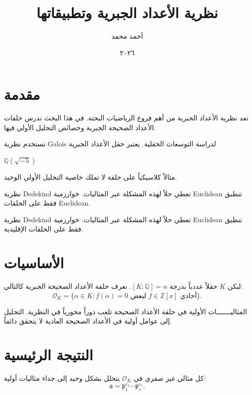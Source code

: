 \documentclass{article}
\title{نظرية الأعداد الجبرية وتطبيقاتها}
\author{أحمد محمد}
\date{٢٠٢٦}
\begin{document}
\maketitle

\section{مقدمة}

تعد نظرية الأعداد الجبرية من أهم فروع الرياضيات البحتة. في هذا البحث ندرس
حلقات الأعداد الصحيحة الجبرية وخصائص التحليل الأولي فيها.


نستخدم نظرية Galois لدراسة التوسعات الحقلية. يعتبر حقل الأعداد الجبرية
\begin{english}$\mathbb{Q}(\sqrt{-5})$\end{english}
مثالاً كلاسيكياً على حلقة لا تملك خاصية التحليل الأولي الوحيد.

نظرية Dedekind تعطي حلاً لهذه المشكلة عبر المثاليات. خوارزمية Euclidean
تنطبق فقط على الحلقات Euclidean.

نظرية \textenglish{Dedekind} تعطي حلاً لهذه المشكلة عبر المثاليات.
خوارزمية \textenglish{Euclidean} تنطبق فقط على الحلقات الإقليدية.

\section{الأساسيات}

ليكن $K$ حقلاً عددياً بدرجة $[K:\mathbb{Q}] = n$.
نعرف حلقة الأعداد الصحيحة الجبرية كالتالي:
\[
  \mathcal{O}_K = \{ \alpha \in K : f(\alpha) = 0 \text{ لبعض } f \in \mathbb{Z}[x] \text{ أحادي} \}.
\]

المثاليـــــــات الأولية في حلقة الأعداد الصحيحة تلعب دوراً محورياً في النظرية.
التحليل إلى عوامل أولية في الأعداد الصحيحة العادية لا يتحقق دائماً.

\section{النتيجة الرئيسية}

\begin{theorem}
كل مثالي غير صفري في $\mathcal{O}_K$ يتحلل بشكل وحيد إلى جداء مثاليات
أولية:
\[
  \mathfrak{a} = \mathfrak{p}_1^{e_1} \cdots \mathfrak{p}_r^{e_r}.
\]
\end{theorem}
\end{document}
